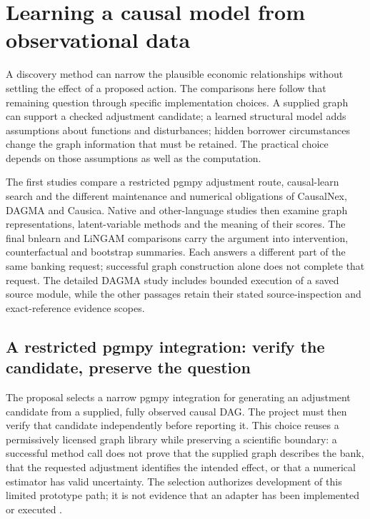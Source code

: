 \chapter{Learning a causal model from observational data}
A discovery method can narrow the plausible economic relationships without
settling the effect of a proposed action. The comparisons here follow that
remaining question through specific implementation choices. A supplied graph
can support a checked adjustment candidate; a learned structural model adds
assumptions about functions and disturbances; hidden borrower circumstances
change the graph information that must be retained. The practical choice
depends on those assumptions as well as the computation.

The first studies compare a restricted pgmpy adjustment route, causal-learn
search and the different maintenance and numerical obligations of CausalNex,
DAGMA and Causica. Native and other-language studies then examine graph
representations, latent-variable methods and the meaning of their scores.
The final bnlearn and LiNGAM comparisons carry the argument into intervention,
counterfactual and bootstrap summaries. Each answers a different part of the
same banking request; successful graph construction alone does not complete
that request. The detailed DAGMA study includes bounded execution of a saved
source module, while the other passages retain their stated source-inspection
and exact-reference evidence scopes.



\section{A restricted pgmpy integration: verify the candidate, preserve the question}
\label{exec13:pgmpy-reuse}

The proposal selects a narrow pgmpy integration for generating an adjustment
candidate from a supplied, fully observed causal DAG. The project must then
verify that candidate independently before reporting it. This choice reuses
a permissively licensed graph library while preserving a scientific boundary:
a successful method call does not prove that the supplied graph describes
the bank, that the requested adjustment identifies the intended effect, or
that a numerical estimator has valid uncertainty. The selection authorizes
development of this limited prototype path; it is not evidence that an
adapter has been implemented or executed
\cite{exec13_pgmpy_reuse_primary,exec13_pgmpy_reuse_oracle}.

